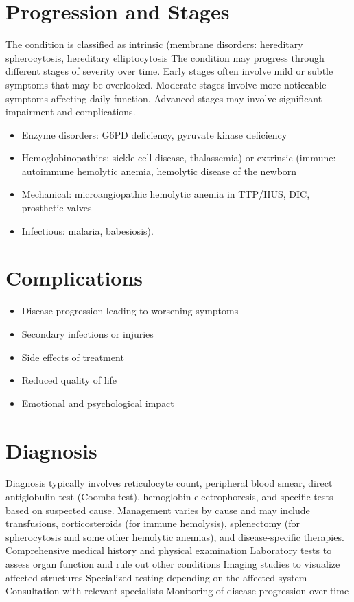 \section{Progression and Stages}
The condition is classified as intrinsic (membrane disorders: hereditary spherocytosis, hereditary elliptocytosis The condition may progress through different stages of severity over time. Early stages often involve mild or subtle symptoms that may be overlooked. Moderate stages involve more noticeable symptoms affecting daily function. Advanced stages may involve significant impairment and complications.

\begin{itemize}[noitemsep]
  \item Enzyme disorders: G6PD deficiency, pyruvate kinase deficiency
  \item Hemoglobinopathies: sickle cell disease, thalassemia) or extrinsic (immune: autoimmune hemolytic anemia, hemolytic disease of the newborn
  \item Mechanical: microangiopathic hemolytic anemia in TTP/HUS, DIC, prosthetic valves
  \item Infectious: malaria, babesiosis).
\end{itemize}
\section{Complications}
\begin{itemize}[noitemsep]
  \item Disease progression leading to worsening symptoms
  \item Secondary infections or injuries
  \item Side effects of treatment
  \item Reduced quality of life
  \item Emotional and psychological impact
\end{itemize}
\section{Diagnosis}
Diagnosis typically involves reticulocyte count, peripheral blood smear, direct antiglobulin test (Coombs test), hemoglobin electrophoresis, and specific tests based on suspected cause. Management varies by cause and may include transfusions, corticosteroids (for immune hemolysis), splenectomy (for spherocytosis and some other hemolytic anemias), and disease-specific therapies. Comprehensive medical history and physical examination Laboratory tests to assess organ function and rule out other conditions Imaging studies to visualize affected structures Specialized testing depending on the affected system Consultation with relevant specialists Monitoring of disease progression over time

